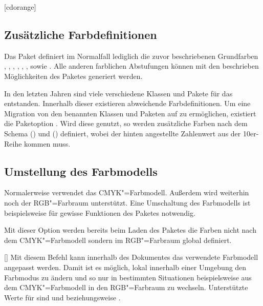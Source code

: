 \begin{Bundle*}{}
\begin{Declaration}{[cdorange]}
\printdeclarationlist%
\end{Declaration}


\subsection{Zusätzliche Farbdefinitionen}
Das Paket  definiert im Normalfall lediglich die zuvor 
beschriebenen Grundfarben , , , 
, , ,  sowie . 
Alle anderen farblichen Abstufungen können mit den beschrieben Möglichkeiten 
des Paketes  generiert werden.

\begin{Declaration}{}
\printdeclarationlist%
%
In den letzten Jahren sind viele verschiedene Klassen und Pakete für das \TUDCD 
entstanden. Innerhalb dieser existieren abweichende Farbdefinitionen. Um eine 
Migration von den benannten Klassen und Paketen auf \TUDScript zu ermöglichen, 
existiert die Paketoption . Wird diese genutzt, so werden 
zusätzliche Farben nach dem Schema () und 
() definiert, wobei der hinten angestellte 
Zahlenwert aus der 10er-Reihe kommen muss.
\end{Declaration}



\subsection{Umstellung des Farbmodells}
%
%
Normalerweise verwendet  das CMYK"=Farbmodell. Außerdem 
wird weiterhin noch der RGB"=Farbraum unterstützt. Eine Umschaltung des 
Farbmodells ist beispielsweise für gewisse Funktionen des Paketes 
 notwendig.

\begin{Declaration}{}
\printdeclarationlist%
%
Mit dieser Option werden bereits beim Laden des Paketes  
die Farben nicht nach dem CMYK"=Farbmodell sondern im RGB"=Farbraum global 
definiert.
\end{Declaration}

\begin{Declaration}{[]}
\printdeclarationlist%
%
Mit diesem Befehl kann innerhalb des Dokumentes das verwendete Farbmodell 
angepasst werden. Damit ist es möglich, lokal innerhalb einer Umgebung den 
Farbmodus zu ändern und so nur in bestimmten Situationen beispielsweise aus dem 
CMYK"=Farbmodell in den RGB"=Farbraum zu wechseln. Unterstützte Werte für 
 sind  und  beziehungsweise 
.
\end{Declaration}


\end{Bundle*}
